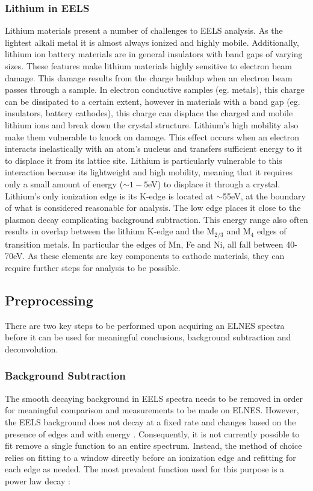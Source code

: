 \subsubsection{Lithium in EELS}
Lithium materials present a number of challenges to EELS analysis.  As the lightest alkali metal it is almost always ionized and highly mobile. Additionally, lithium ion battery materials are in general insulators with band gaps of varying sizes. These features make lithium materials highly sensitive to electron beam damage.  This damage results from the charge buildup when an electron beam passes through a sample.  In electron conductive samples (eg. metals), this charge can be dissipated to a certain extent, however in materials with a band gap (eg. insulators, battery cathodes), this charge can displace the charged and mobile lithium ions and break down the crystal structure.  Lithium's high mobility also make them vulnerable to knock on damage.  This effect occurs when an electron interacts inelastically with an atom's nucleus and transfers sufficient energy to it to displace it from its lattice site.  Lithium is particularly vulnerable to this interaction because its lightweight and high mobility, meaning that it requires only a small amount of energy ($ \sim 1-5$eV) to displace it through a crystal.\\  
Lithium's only ionization edge is its K-edge is located at $\mathrm{\sim}$55eV, at the boundary of what is considered reasonable for analysis.  The low edge places it close to the plasmon decay complicating background subtraction.  This energy range also often results in overlap between the lithium K-edge and the $\mathrm{M_{2 / 3}}$ and $\mathrm{M_4}$ edges of transition metals. In particular the edges of Mn, Fe and Ni, all fall between 40-70eV.  As these elements are key components to cathode materials, they can require further steps for analysis to be possible.



\subsection{Preprocessing}

There are two key steps to be performed upon acquiring an ELNES spectra before it can be used for meaningful conclusions, background subtraction and deconvolution. 

\subsubsection{Background Subtraction}
The smooth decaying background in EELS spectra needs to be removed in order for meaningful comparison and measurements to be made on ELNES.  However, the EELS background does not decay at a fixed rate and changes based on the presence of edges and with energy \cite{new_bg}. Consequently, it is not currently possible to fit remove a single function to an entire spectrum.  Instead, the method of choice relies on fitting to a window directly before an ionization edge and refitting for each edge as needed.  The most prevalent function used for this purpose is a power law decay \cite{Egerton}: 

